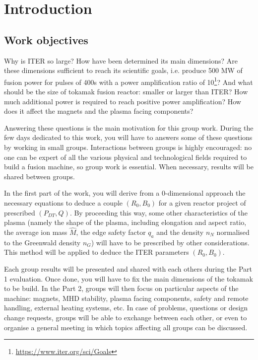 \section{Introduction}
\subsection{Work objectives}
Why is ITER so large? How have been determined its main dimensions? Are these dimensions sufficient to reach its scientific goals,  i.e. produce 500 MW of fusion power for pulses of 400s with a power amplification ratio of 10\footnote{\url{https://www.iter.org/sci/Goals}}? And what should be the size of tokamak fusion reactor: smaller or larger than ITER? How much additional power is required to reach positive power amplification? How does it affect the magnets and the plasma facing components? 

Answering these questions is the main motivation for this group work. During the few days dedicated to this work, you will have to answers some of these questions by working in small groups. Interactions between groups is highly encouraged: no one can be expert of all the various physical and technological fields required to build a fusion machine, so group work is essential. When necessary, results will be shared between groups.

In the first part of the work, you will derive from a 0-dimensional approach the necessary equations to deduce a couple $(R_0, B_0)$ for a given reactor project of prescribed $(P_{DT}, Q)$. By proceeding this way, some other characteristics of the plasma (namely the shape of the plasma, including elongation and aspect ratio, the average ion mass $\hat M$, the edge safety factor $q_a$ and the density $n_N$ normalised to the Greenwald density $n_G$) will have to be prescribed by other considerations. This method will be applied to deduce the ITER parameters $(R_0, B_0)$. 

Each group results will be presented and shared with each others during the Part 1 evaluation. Once done, you will have to fix the main dimensions of the tokamak to be build. In the Part 2, groups will then focus on particular aspects of the machine: magnets, MHD stability, plasma facing components, safety and remote handling, external heating systems, etc. In case of problems, questions or design change requests, groups will be able to exchange between each other, or even to organise a general meeting in which topics affecting all groups can be discussed.


